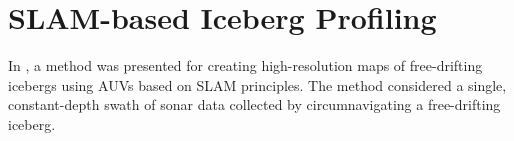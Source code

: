 %
%
%
%
%

\section{SLAM-based Iceberg Profiling}

In \cite{Kimball2011b}, a method was presented for creating high-resolution maps of free-drifting icebergs using AUVs based on SLAM principles. The method considered a single, constant-depth swath of sonar data collected by circumnavigating a free-drifting iceberg. 

